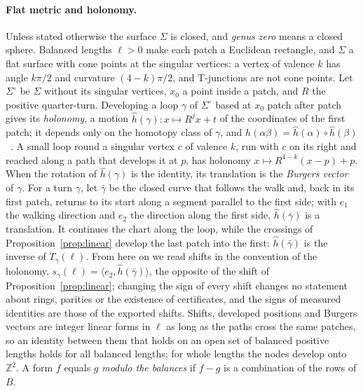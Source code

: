 \documentclass[11pt,a4paper]{article}
\newcommand{\Z}{\mathbb{Z}}
\newcommand{\shift}{s}
\begin{document}
\paragraph{Flat metric and holonomy.}
Unless stated otherwise the surface $\Sigma$ is closed, and \emph{genus zero}
means a closed sphere. Balanced lengths $\ell > 0$ make each patch a
Euclidean rectangle, and $\Sigma$ a flat surface with cone points at the
singular vertices: a vertex of valence $k$ has angle $k\pi/2$ and curvature
$(4-k)\pi/2$, and T-junctions are not cone points. Let $\Sigma^\circ$ be $\Sigma$ without its singular vertices,
$x_0$ a point inside a patch, and $R$ the positive quarter-turn. Developing a
loop $\gamma$ of $\Sigma^\circ$ based at $x_0$ patch after patch gives its
\emph{holonomy}, a motion $\hat h(\gamma)\colon x \mapsto R^j x + t$ of the
coordinates of the first patch; it depends only on the homotopy class of
$\gamma$, and $\hat h(\alpha\beta) = \hat h(\alpha) \circ \hat
h(\beta)$~\cite{izmestiev2013torus}. A small loop round a singular vertex $c$
of valence $k$, run with $c$ on its right and reached along a path that
develops it at $p$, has holonomy $x \mapsto R^{4-k}(x - p) + p$. When the
rotation of $\hat h(\gamma)$ is the identity, its translation is the
\emph{Burgers vector} of $\gamma$. For a turn $\gamma$, let $\bar\gamma$ be
the closed curve that follows the walk and, back in its first patch, returns
to its start along a segment parallel to the first side; with $e_1$ the
walking direction and $e_2$ the direction along the first side, $\hat
h(\bar\gamma)$ is a translation. It continues the chart along the loop,
while the crossings of Proposition~\ref{prop:linear} develop the last patch
into the first: $\hat h(\bar\gamma)$ is the inverse of $T_\gamma(\ell)$. From
here on we read shifts in the convention of the holonomy, $\shift_\gamma(\ell)
= \langle e_2, \hat h(\bar\gamma) \rangle$, the opposite of the shift of
Proposition~\ref{prop:linear}; changing the sign of every shift changes no
statement about rings, parities or the existence of certificates, and the
signs of measured identities are those of the exported shifts. Shifts, developed positions and Burgers vectors are
integer linear forms in $\ell$ as long as the paths cross the same patches, so
an identity between them that holds on an open set of balanced positive
lengths holds for all balanced lengths; for whole lengths the nodes develop
onto $\Z^2$. A form $f$ equals $g$ \emph{modulo the balances} if $f - g$ is a
combination of the rows of $B$.
\end{document}
